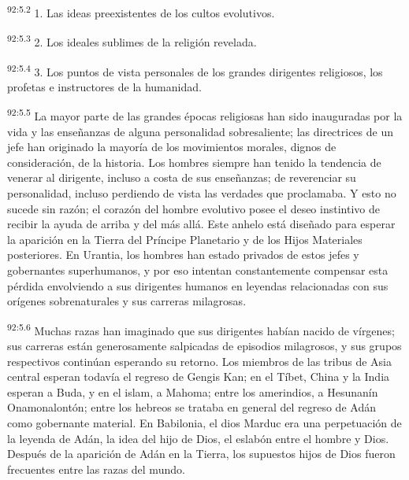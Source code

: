 \documentclass[twoside, 11pt]{book}
\begin{document}
\par
\textsuperscript{92:5.2} 1. Las ideas preexistentes de los cultos evolutivos.

\par
\textsuperscript{92:5.3} 2. Los ideales sublimes de la religión revelada.

\par
\textsuperscript{92:5.4} 3. Los puntos de vista personales de los grandes dirigentes religiosos, los profetas e instructores de la humanidad.

\par
\textsuperscript{92:5.5} La mayor parte de las grandes épocas religiosas han sido inauguradas por la vida y las enseñanzas de alguna personalidad sobresaliente; las directrices de un jefe han originado la mayoría de los movimientos morales, dignos de consideración, de la historia. Los hombres siempre han tenido la tendencia de venerar al dirigente, incluso a costa de sus enseñanzas; de reverenciar su personalidad, incluso perdiendo de vista las verdades que proclamaba. Y esto no sucede sin razón; el corazón del hombre evolutivo posee el deseo instintivo de recibir la ayuda de arriba y del más allá. Este anhelo está diseñado para esperar la aparición en la Tierra del Príncipe Planetario y de los Hijos Materiales posteriores. En Urantia, los hombres han estado privados de estos jefes y gobernantes superhumanos, y por eso intentan constantemente compensar esta pérdida envolviendo a sus dirigentes humanos en leyendas relacionadas con sus orígenes sobrenaturales y sus carreras milagrosas.

\par
\textsuperscript{92:5.6} Muchas razas han imaginado que sus dirigentes habían nacido de vírgenes; sus carreras están generosamente salpicadas de episodios milagrosos, y sus grupos respectivos continúan esperando su retorno. Los miembros de las tribus de Asia central esperan todavía el regreso de Gengis Kan; en el Tíbet, China y la India esperan a Buda, y en el islam, a Mahoma; entre los amerindios, a Hesunanín Onamonalontón; entre los hebreos se trataba en general del regreso de Adán como gobernante material. En Babilonia, el dios Marduc era una perpetuación de la leyenda de Adán, la idea del hijo de Dios, el eslabón entre el hombre y Dios. Después de la aparición de Adán en la Tierra, los supuestos hijos de Dios fueron frecuentes entre las razas del mundo.
\end{document}
